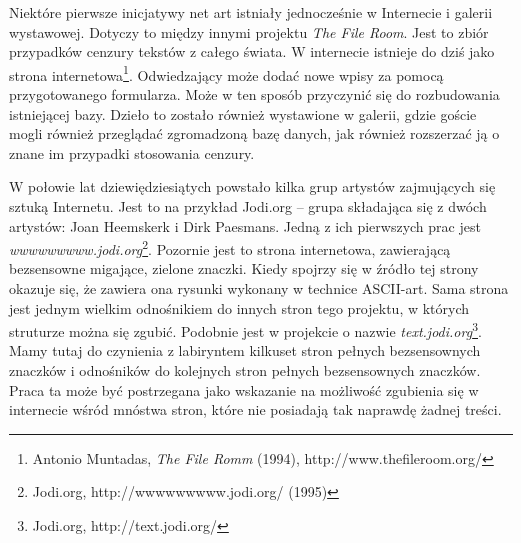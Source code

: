 \documentclass[a4paper,12pt]{article}
\begin{document}
Niektóre pierwsze inicjatywy net art istniały jednocześnie w Internecie
i galerii wystawowej. Dotyczy to między innymi projektu
\textit{The File Room}. Jest to zbiór przypadków cenzury tekstów z całego
świata. W internecie istnieje do dziś jako strona
internetowa\footnote{Antonio Muntadas, \textit{The File Romm} (1994),
http://www.thefileroom.org/}. Odwiedzający
może dodać nowe wpisy za pomocą przygotowanego formularza. Może w ten sposób
przyczynić się do rozbudowania istniejącej bazy. Dzieło to zostało również
wystawione w galerii, gdzie goście mogli również przeglądać zgromadzoną
bazę danych, jak również rozszerzać ją o znane im przypadki stosowania
cenzury.

W połowie lat dziewiędziesiątych powstało kilka grup artystów zajmujących
się sztuką Internetu. Jest to na przykład Jodi.org -- grupa
składająca się z dwóch artystów: Joan Heemskerk i Dirk Paesmans. Jedną
z ich pierwszych prac jest
\textit{wwwwwwwww.jodi.org}\footnote{Jodi.org, http://wwwwwwwww.jodi.org/
(1995)}. Pozornie jest to strona internetowa, zawierającą bezsensowne
migające, zielone znaczki. Kiedy spojrzy się w źródło tej strony okazuje
się, że zawiera ona rysunki wykonany w technice ASCII-art. Sama strona
jest jednym wielkim odnośnikiem do innych stron tego projektu, w których
struturze można się zgubić. Podobnie jest w projekcie o nazwie
\textit{text.jodi.org}\footnote{Jodi.org, http://text.jodi.org/}. Mamy tutaj
do czynienia z labiryntem kilkuset stron pełnych bezsensownych znaczków
i odnośników do kolejnych stron pełnych bezsensownych znaczków. Praca
ta może być postrzegana jako wskazanie na możliwość zgubienia się w internecie
wśród mnóstwa stron, które nie posiadają tak naprawdę żadnej treści.
\end{document}

